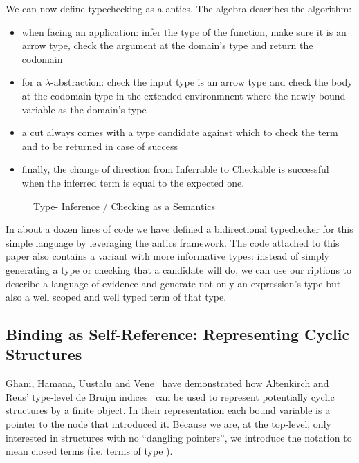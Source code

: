 We can now define typechecking as a antics. The algebra describes the
algorithm:
\begin{itemize}
  \item when facing an application: infer the type of the function, make sure
    it is an arrow type, check the argument at the domain's type and return the
    codomain
  \item for a $\lambda$-abstraction: check the input type is an arrow type and
    check the body at the codomain type in the extended environmnent where the
    newly-bound variable as the domain's type
  \item a cut always comes with a type candidate against which to check the term
    and to be returned in case of success
  \item finally, the change of direction from Inferrable to Checkable is successful
    when the inferred term is equal to the expected one.
\end{itemize}

\begin{figure}[h]
\caption{Type- Inference / Checking as a Semantics}
\end{figure}

In about a dozen lines of code we have defined a bidirectional typechecker for
this simple language by leveraging the antics framework. The code attached
to this paper also contains a variant with more informative types: instead of simply
generating a type or checking that a candidate will do, we can use our riptions
to describe a language of evidence and generate not only an expression's type but
also a well scoped and well typed term of that type.

\subsection{Binding as Self-Reference: Representing Cyclic Structures}

Ghani, Hamana, Uustalu and Vene~\citeyear{ghani2006representing} have
demonstrated how Altenkirch and Reus' type-level de Bruijn
indices~\citeyear{altenkirch1999monadic} can be used to represent
potentially cyclic structures by a finite object. In their
representation each bound variable is a pointer to the node
that introduced it. Because we are, at the top-level, only
interested in structures with no ``dangling pointers'', we introduce
the notation   to mean closed terms (i.e. terms of type
   \AIC{[]}).

